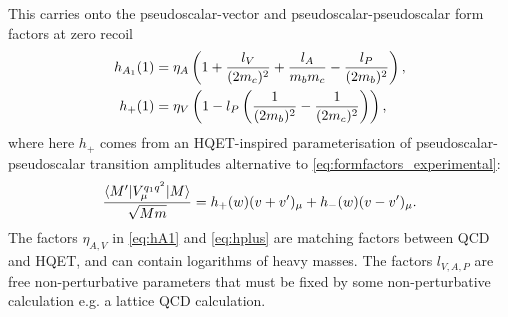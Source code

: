 This carries onto the pseudoscalar-vector and pseudoscalar-pseudoscalar form factors at zero recoil
\begin{align}
  \label{eq:hA1}
  h_{A_1}(1) &= \eta_A \left( 1 + {l_V\over (2m_c)^2} + {l_A\over m_b m_c} - {l_P\over (2m_b)^2} \right), \\
  h_+(1) &= \eta_V \left( 1 - l_P \left( {1\over (2m_b)^2} - {1\over (2m_c)^2} \right) \right),
  \label{eq:hplus}
\end{align}
where here $h_+$ comes from an HQET-inspired parameterisation of pseudoscalar-pseudoscalar transition amplitudes alternative to \eqref{eq:formfactors_experimental}:
\begin{align}
  {\langle M' | V^{q_1q^2}_{\mu} | M \rangle \over \sqrt{Mm}} = h_+(w)(v+v')_{\mu} + h_-(w)(v-v')_{\mu}.
\end{align}
The factors $\eta_{A,V}$ in \eqref{eq:hA1} and \eqref{eq:hplus} are matching factors between QCD and HQET, and can contain logarithms of heavy masses. The factors $l_{V,A,P}$ are free non-perturbative parameters that must be fixed by some non-perturbative calculation e.g. a lattice QCD calculation.



